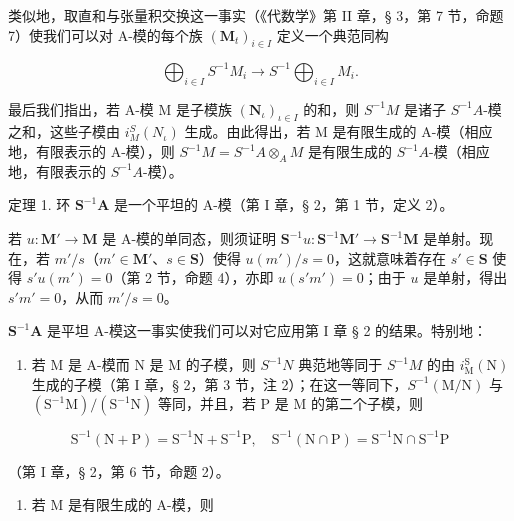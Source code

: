 类似地，取直和与张量积交换这一事实（《代数学》第 II 章，§ 3，第 7 节，命题 7）使我们可以对 A-模的每个族 \((\mathbf{M}_t)_{i\in I}\) 定义一个典范同构

\[
\bigoplus_ {i \in I} S ^ {- 1} M _ {i} \rightarrow S ^ {- 1} \bigoplus_ {i \in I} M _ {i}.
\]

最后我们指出，若 A-模 M 是子模族 \((\mathbf{N}_{\iota})_{\iota\in I}\) 的和，则 \(S^{-1}M\) 是诸子 \(S^{-1}A\)-模之和，这些子模由 \(i_{M}^{S}(N_{\iota})\) 生成。由此得出，若 M 是有限生成的 A-模（相应地，有限表示的 A-模），则 \(S^{-1}M = S^{-1}A \otimes_{A} M\) 是有限生成的 \(S^{-1}A\)-模（相应地，有限表示的 \(S^{-1}A\)-模）。

定理 1. 环 \(\mathbf{S}^{-1}\mathbf{A}\) 是一个平坦的 A-模（第 I 章，§ 2，第 1 节，定义 2）。

若 \(u: \mathbf{M}' \to \mathbf{M}\) 是 A-模的单同态，则须证明 \(\mathbf{S}^{-1}u: \mathbf{S}^{-1}\mathbf{M}' \to \mathbf{S}^{-1}\mathbf{M}\) 是单射。现在，若 \(m'/s\)（\(m' \in \mathbf{M}'\)、\(s \in \mathbf{S}\)）使得 \(u(m')/s = 0\)，这就意味着存在 \(s' \in \mathbf{S}\) 使得 \(s'u(m') = 0\)（第 2 节，命题 4），亦即 \(u(s'm') = 0\)；由于 \(u\) 是单射，得出 \(s'm' = 0\)，从而 \(m'/s = 0\)。

\(\mathbf{S}^{-1}\mathbf{A}\) 是平坦 A-模这一事实使我们可以对它应用第 I 章 § 2 的结果。特别地：

\begin{enumerate}
\def\labelenumi{(\arabic{enumi})}
\tightlist
\item
  若 M 是 A-模而 N 是 M 的子模，则 \(S^{-1}N\) 典范地等同于 \(S^{-1}M\) 的由 \(i_{\mathrm{M}}^{\mathrm{S}}(\mathrm{N})\) 生成的子模（第 I 章，§ 2，第 3 节，注 2）；在这一等同下，\(S^{-1}(\mathrm{M}/\mathrm{N})\) 与 \((\mathrm{S}^{-1}\mathrm{M})/(\mathrm{S}^{-1}\mathrm{N})\) 等同，并且，若 P 是 M 的第二个子模，则
\end{enumerate}

\[
\mathrm{S} ^ {- 1} (\mathrm{N} + \mathrm{P}) = \mathrm{S} ^ {- 1} \mathrm{N} + \mathrm{S} ^ {- 1} \mathrm{P}, \quad \mathrm{S} ^ {- 1} (\mathrm{N} \cap \mathrm{P}) = \mathrm{S} ^ {- 1} \mathrm{N} \cap \mathrm{S} ^ {- 1} \mathrm{P}
\]

（第 I 章，§ 2，第 6 节，命题 2）。

\begin{enumerate}
\def\labelenumi{(\arabic{enumi})}
\setcounter{enumi}{1}
\tightlist
\item
  若 M 是有限生成的 A-模，则
\end{enumerate}

